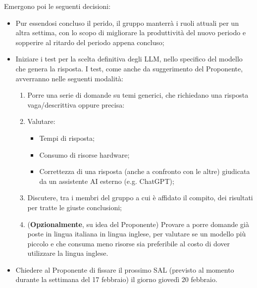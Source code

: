 Emergono poi le seguenti decisioni:
\begin{itemize}
\item Pur essendosi concluso il perido, il gruppo manterrà i ruoli attuali per un altra settima,  con lo scopo di migliorare la produttività del nuovo periodo e sopperire al ritardo del periodo appena concluso;
\item Iniziare i test per la scelta definitiva degli LLM, nello specifico del modello che genera la risposta. I test, come anche da suggerimento del Proponente, avverranno nelle seguenti modalità:
    \begin{enumerate}
        \item Porre una serie di domande su temi generici, che richiedano una risposta vaga/descrittiva oppure precisa:
        \item Valutare:
            \begin{itemize}
                \item Tempi di risposta;
                \item Consumo di risorse hardware;
                \item Correttezza di una risposta (anche a confronto con le altre) giudicata da un assistente AI esterno (e.g. ChatGPT);
            \end{itemize}
       \item Discutere, tra i membri del gruppo a cui è affidato il compito, dei risultati per tratte le giuste conclusioni;    

       \item (\textbf{Opzionalmente}, su idea del Proponente) Provare a porre domande già poste in lingua italiana in lingua inglese, per valutare se un modello più piccolo e che consuma meno risorse sia preferibile al costo di dover utilizzare la lingua inglese.
    \end{enumerate}
\item Chiedere al Proponente di fissare il prossimo SAL (previsto al momento durante la settimana del 17 febbraio) il giorno giovedì 20 febbraio.

\end{itemize}